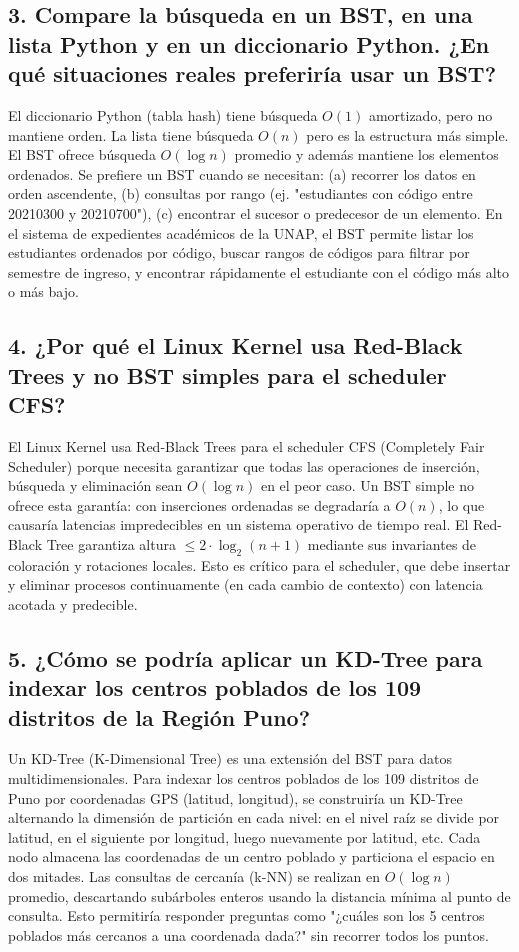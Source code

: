 \documentclass{article}
\begin{document}
\subsection*{3. Compare la búsqueda en un BST, en una lista Python y en un diccionario Python. ¿En qué situaciones reales preferiría usar un BST?}
El diccionario Python (tabla hash) tiene búsqueda $O(1)$ amortizado, pero no mantiene orden. La lista tiene búsqueda $O(n)$ pero es la estructura más simple. El BST ofrece búsqueda $O(\log n)$ promedio y además mantiene los elementos ordenados. Se prefiere un BST cuando se necesitan: (a) recorrer los datos en orden ascendente, (b) consultas por rango (ej. "estudiantes con código entre 20210300 y 20210700"), (c) encontrar el sucesor o predecesor de un elemento. En el sistema de expedientes académicos de la UNAP, el BST permite listar los estudiantes ordenados por código, buscar rangos de códigos para filtrar por semestre de ingreso, y encontrar rápidamente el estudiante con el código más alto o más bajo.

\subsection*{4. ¿Por qué el Linux Kernel usa Red-Black Trees y no BST simples para el scheduler CFS?}
El Linux Kernel usa Red-Black Trees para el scheduler CFS (Completely Fair Scheduler) porque necesita garantizar que todas las operaciones de inserción, búsqueda y eliminación sean $O(\log n)$ en el peor caso. Un BST simple no ofrece esta garantía: con inserciones ordenadas se degradaría a $O(n)$, lo que causaría latencias impredecibles en un sistema operativo de tiempo real. El Red-Black Tree garantiza altura $\leq 2 \cdot \log_2(n+1)$ mediante sus invariantes de coloración y rotaciones locales. Esto es crítico para el scheduler, que debe insertar y eliminar procesos continuamente (en cada cambio de contexto) con latencia acotada y predecible.

\subsection*{5. ¿Cómo se podría aplicar un KD-Tree para indexar los centros poblados de los 109 distritos de la Región Puno?}
Un KD-Tree (K-Dimensional Tree) es una extensión del BST para datos multidimensionales. Para indexar los centros poblados de los 109 distritos de Puno por coordenadas GPS (latitud, longitud), se construiría un KD-Tree alternando la dimensión de partición en cada nivel: en el nivel raíz se divide por latitud, en el siguiente por longitud, luego nuevamente por latitud, etc. Cada nodo almacena las coordenadas de un centro poblado y particiona el espacio en dos mitades. Las consultas de cercanía (k-NN) se realizan en $O(\log n)$ promedio, descartando subárboles enteros usando la distancia mínima al punto de consulta. Esto permitiría responder preguntas como "¿cuáles son los 5 centros poblados más cercanos a una coordenada dada?" sin recorrer todos los puntos.
\end{document}
